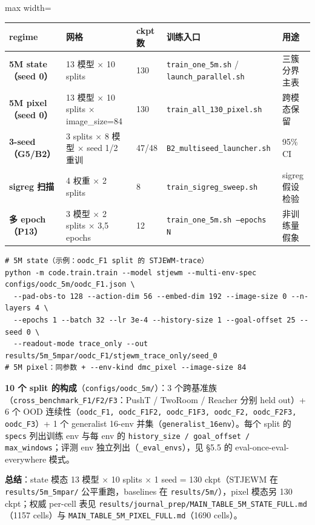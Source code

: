 \documentclass[11pt,a4paper]{article}
\begin{document}
\begingroup\scriptsize
\begin{adjustbox}{max width=\textwidth}
\begin{tabular}{@{}p{}p{}p{}p{}p{}@{}}
\toprule
\textbf{regime} & \textbf{网格} & \textbf{ckpt 数} & \textbf{训练入口} & \textbf{用途} \\
\midrule
\textbf{5M state（seed 0）} & 13 模型 × 10 splits & 130 & \texttt{train\_one\_5m.sh} / \texttt{launch\_parallel.sh} & 三簇分界主表 \\
\textbf{5M pixel（seed 0）} & 13 模型 × 10 splits × image\_size=84 & 130 & \texttt{train\_all\_130\_pixel.sh} & 跨模态保留 \\
\textbf{3-seed（G5/B2）} & 3 splits × 8 模型 × seed 1/2 重训 & 47/48 & \texttt{B2\_multiseed\_launcher.sh} & 95\% CI \\
\textbf{sigreg 扫描} & 4 权重 × 2 splits & 8 & \texttt{train\_sigreg\_sweep.sh} & sigreg 假设检验 \\
\textbf{多 epoch（P13）} & 3 模型 × 2 splits × {3,5} epochs & 12 & \texttt{train\_one\_5m.sh --epochs N} & 非训练量假象 \\
\bottomrule
\end{tabular}
\end{adjustbox}
\endgroup
\begin{footnotesize}
\begin{verbatim}
# 5M state（示例：oodc_F1 split 的 STJEWM-trace）
python -m code.train.train --model stjewm --multi-env-spec configs/oodc_5m/oodc_F1.json \
  --pad-obs-to 128 --action-dim 56 --embed-dim 192 --image-size 0 --n-layers 4 \
  --epochs 1 --batch 32 --lr 3e-4 --history-size 1 --goal-offset 25 --seed 0 \
  --readout-mode trace_only --out results/5m_5mpar/oodc_F1/stjewm_trace_only/seed_0
# 5M pixel：同参数 + --env-kind dmc_pixel --image-size 84
\end{verbatim}
\end{footnotesize}

\textbf{10 个 split 的构成}（\texttt{configs/oodc\_5m/}）：3 个跨基准族（\texttt{cross\_benchmark\_F1/F2/F3}：PushT / TwoRoom / Reacher 分别 held out）+ 6 个 OOD 连续性（\texttt{oodc\_F1, oodc\_F1F2, oodc\_F1F3, oodc\_F2, oodc\_F2F3, oodc\_F3}）+ 1 个 generalist 16-env 并集（\texttt{generalist\_16env}）。每个 split 的 \texttt{specs} 列出训练 env 与每 env 的 \texttt{history\_size / goal\_offset / max\_windows}；评测 env 独立列出（\texttt{\_eval\_envs}），见 §5.5 的 eval-once-eval-everywhere 模式。

\textbf{总结}：state 模态 13 模型 × 10 splits × 1 seed = 130 ckpt（STJEWM 在 \texttt{results/5m\_5mpar/} 公平重跑，baselines 在 \texttt{results/5m/}），pixel 模态另 130 ckpt；权威 per-cell 表见 \texttt{results/journal\_prep/MAIN\_TABLE\_5M\_STATE\_FULL.md}（1157 cells）与 \texttt{MAIN\_TABLE\_5M\_PIXEL\_FULL.md}（1690 cells）。
\end{document}
